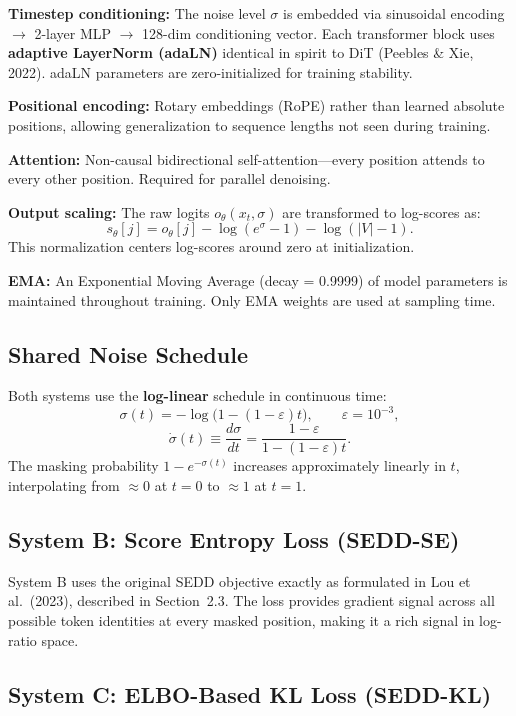 \documentclass[11pt,a4paper]{article}
\begin{document}
\textbf{Timestep conditioning:} The noise level $\sigma$ is embedded via sinusoidal encoding $\to$ 2-layer MLP $\to$ 128-dim conditioning vector. Each transformer block uses \textbf{adaptive LayerNorm (adaLN)} identical in spirit to DiT (Peebles \& Xie, 2022). adaLN parameters are zero-initialized for training stability.

\textbf{Positional encoding:} Rotary embeddings (RoPE) rather than learned absolute positions, allowing generalization to sequence lengths not seen during training.

\textbf{Attention:} Non-causal bidirectional self-attention---every position attends to every other position. Required for parallel denoising.

\textbf{Output scaling:} The raw logits $o_\theta(x_t, \sigma)$ are transformed to log-scores as:
\[
  s_\theta[j] = o_\theta[j] - \log(e^\sigma - 1) - \log(|V| - 1).
\]
This normalization centers log-scores around zero at initialization.

\textbf{EMA:} An Exponential Moving Average (decay = 0.9999) of model parameters is maintained throughout training. Only EMA weights are used at sampling time.

\subsection{Shared Noise Schedule}

Both systems use the \textbf{log-linear} schedule in continuous time:
\[
  \sigma(t) = -\log\!\bigl(1 - (1-\varepsilon)t\bigr), \qquad \varepsilon = 10^{-3},
\]
\[
  \dot{\sigma}(t) \equiv \frac{d\sigma}{dt} = \frac{1-\varepsilon}{1 - (1-\varepsilon)t}.
\]
The masking probability $1 - e^{-\sigma(t)}$ increases approximately linearly in $t$, interpolating from $\approx 0$ at $t=0$ to $\approx 1$ at $t=1$.

\subsection{System B: Score Entropy Loss (SEDD-SE)}

System B uses the original SEDD objective exactly as formulated in Lou et al.\ (2023), described in Section~2.3. The loss provides gradient signal across all possible token identities at every masked position, making it a rich signal in log-ratio space.

\subsection{System C: ELBO-Based KL Loss (SEDD-KL)}
\end{document}
